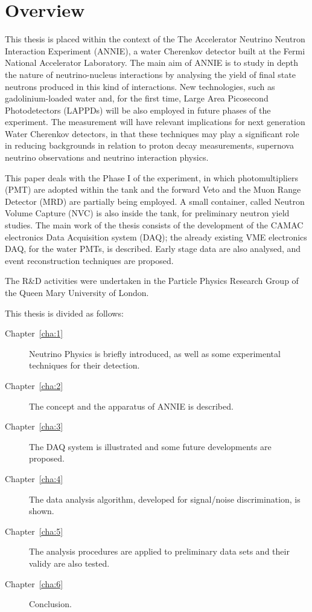 \clearpage
\pagestyle{plain}
\chapter{Overview}
This thesis is placed within the context of the %
The Accelerator Neutrino Neutron Interaction Experiment (ANNIE), a water Cherenkov %
detector built at the Fermi National Accelerator Laboratory.
The main aim of ANNIE is to study in depth the nature of neutrino-nucleus interactions %
by analysing the yield of final state neutrons produced in this kind of interactions.
New technologies, such as gadolinium-loaded water and, for the first time, %
Large Area Picosecond Photodetectors (LAPPDs) will be also employed in future phases of %
the experiment.
The measurement will have relevant implications for next generation Water Cherenkov detectors, %
in that these techniques may play a significant role %
in reducing backgrounds in relation to proton decay measurements, %
supernova neutrino observations and neutrino interaction physics.

This paper deals with the Phase I of the experiment, in which photomultipliers (PMT) are adopted %
within the tank and the forward Veto and the Muon Range Detector (MRD) are %
partially being employed.
A small container, called Neutron Volume Capture (NVC) %
is also inside the tank, for preliminary neutron yield studies.
The main work of the thesis consists of the development of the CAMAC electronics %
Data Acquisition system (DAQ); the already existing VME electronics DAQ, %
for the water PMTs, is described.
Early stage data are also analysed, and event reconstruction %
techniques are proposed.

The R\&D activities were undertaken in the Particle Physics Research Group of the %
Queen Mary University of London.

\vspace{25mm}
This thesis is divided as follows:
\begin{description}
  \item[Chapter~\ref{cha:1}] Neutrino Physics is briefly introduced, as well as some %
    experimental techniques for their detection.
  \item[Chapter~\ref{cha:2}] The concept and the apparatus of ANNIE is described.
  \item[Chapter~\ref{cha:3}] The DAQ system is illustrated and some future developments %
    are proposed.
  \item[Chapter~\ref{cha:4}] The data analysis algorithm, developed for signal/noise discrimination, is shown.
  \item[Chapter~\ref{cha:5}] The analysis procedures are applied to preliminary data sets and their validy %
    are also tested.
  \item[Chapter~\ref{cha:6}] Conclusion.
\end{description}
